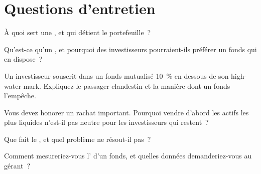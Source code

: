 \section{Questions d'entretien}

\begin{interviewq}\label{iq:fm:the-asset-manager-and-the-fund:1}
À quoi sert une , et qui détient le portefeuille~?
\end{interviewq}

\begin{interviewq}\label{iq:fm:the-asset-manager-and-the-fund:2}
Qu'est-ce qu'un , et pourquoi des investisseurs pourraient-ils préférer un fonds qui en dispose~?
\end{interviewq}

\begin{interviewq}\label{iq:fm:the-asset-manager-and-the-fund:3}
Un investisseur souscrit dans un fonds mutualisé 10~\% en dessous de son high-water mark. Expliquez le passager clandestin et la manière dont un fonds l'empêche.
\end{interviewq}

\begin{interviewq}\label{iq:fm:the-asset-manager-and-the-fund:4}
Vous devez honorer un rachat important. Pourquoi vendre d'abord les actifs les plus liquides n'est-il pas neutre pour les investisseurs qui restent~?
\end{interviewq}

\begin{interviewq}\label{iq:fm:the-asset-manager-and-the-fund:5}
Que fait le , et quel problème ne résout-il pas~?
\end{interviewq}

\begin{interviewq}\label{iq:fm:the-asset-manager-and-the-fund:6}
Comment mesureriez-vous l' d'un fonds, et quelles données demanderiez-vous au gérant~?
\end{interviewq}
